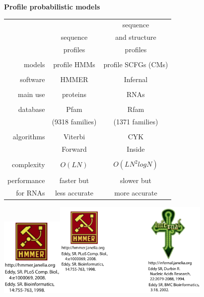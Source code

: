 \documentclass[landscape]{slides}
\begin{document}
\begin{slide}
\begin{center}
\textbf{Profile probabilistic models}
\end{center}
\medskip

\begin{center}
\small
\begin{tabular}{r|cc} 
             &         & sequence \\
             & sequence& and structure \\
             & profiles& profiles \\ \hline
  \\
  models     & profile HMMs    & profile SCFGs (CMs) \\ 
  \\
  software   & {\sc HMMER}     & {\sc Infernal} \\ 
  \\
  main use   & proteins        & RNAs \\ 
  \\
  database   & {\sc Pfam}      & {\sc Rfam} \\
             & (9318 families) & (1371 families) \\
  \\
  algorithms & Viterbi & CYK \\
             & Forward & Inside \\
             &         & \\
  complexity & $O(LN)$ & $O(LN^{2} log N)$ \\
  \\
  performance& faster but    & slower but    \\
  for RNAs   & less accurate & more accurate \\
\end{tabular}

\hspace{1.2in}\includegraphics[height=1.5in]{figs/hmmer_logo}\hspace{1.05in}\includegraphics[height=1.8in]{figs/infernal_logo}


\end{center}
\end{slide}
\end{document}
